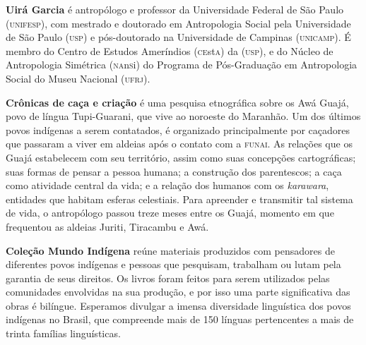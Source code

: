 \textbf{Uirá Garcia} é antropólogo e professor da Universidade Federal de São Paulo \textsc{(unifesp)}, com mestrado e doutorado em Antropologia Social pela Universidade de São Paulo \textsc{(usp)} e pós-doutorado na Universidade de Campinas \textsc{(unicamp)}. 
É membro do Centro de Estudos Ameríndios (\textsc{ce}st\textsc{a}) da \textsc{(usp)}, e do Núcleo de Antropologia Simétrica (\textsc{na}n\textsc{s}i) do Programa de Pós-Graduação em Antropologia Social do Museu Nacional (\textsc{ufrj}). %
	
\textbf{Crônicas de caça e criação} é uma pesquisa etnográfica sobre os Awá Guajá, povo de língua Tupi-Guarani, que vive ao noroeste do Maranhão. Um dos últimos povos indígenas a serem contatados, é organizado principalmente por caçadores que passaram a viver em aldeias após o contato com a \textsc{funai}. As relações que os Guajá estabelecem com seu território, assim como suas concepções cartográficas; suas formas de pensar a pessoa humana; a construção dos parentescos; a caça como atividade central da vida; e a relação dos humanos com os \emph{karawara}, entidades que habitam esferas celestiais. Para apreender e transmitir tal sistema de vida, o antropólogo passou treze meses entre os Guajá, momento em que frequentou as aldeias Juriti, Tiracambu e Awá.

\textbf{Coleção Mundo Indígena} reúne materiais produzidos com pensadores de diferentes povos indígenas e pessoas que pesquisam, trabalham ou lutam pela garantia de seus direitos. Os livros foram feitos para serem utilizados pelas comunidades envolvidas na sua produção, e por isso uma parte significativa das obras é bilíngue. Esperamos divulgar a imensa diversidade linguística dos povos indígenas no Brasil, que compreende mais de 150 línguas pertencentes a mais de trinta famílias linguísticas.



